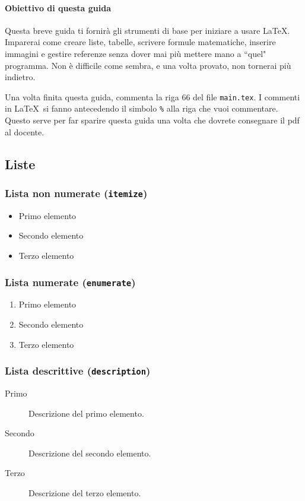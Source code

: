 \paragraph{Obiettivo di questa guida}
Questa breve guida ti fornirà gli strumenti di base per iniziare a usare \LaTeX. Imparerai come creare liste, tabelle, scrivere formule matematiche, inserire immagini e gestire referenze senza dover mai più mettere mano a ``quel" programma.
Non è difficile come sembra, e una volta provato, non tornerai più indietro.

\bigskip
\begin{tcolorbox}[
    colback=orange!10,
    colframe=orange!70!black,
    title=\textbf{Importante!},
    ]
    Una volta finita questa guida, commenta la riga 66 del file \texttt{main.tex}.
    I commenti in \LaTeX\ si fanno antecedendo il simbolo \texttt{\%} alla riga che vuoi commentare.
    Questo serve per far sparire questa guida una volta che dovrete consegnare il pdf al docente.
\end{tcolorbox}

\subsection*{Liste}

\subsubsection*{Lista non numerate (\texttt{itemize})}
\begin{itemize}
    \item Primo elemento
    \item Secondo elemento
    \item Terzo elemento
\end{itemize}

\subsubsection*{Lista numerate (\texttt{enumerate})}
\begin{enumerate}
    \item Primo elemento
    \item Secondo elemento
    \item Terzo elemento
\end{enumerate}

\subsubsection*{Lista descrittive (\texttt{description})}
\begin{description}
    \item[Primo] Descrizione del primo elemento.
    \item[Secondo] Descrizione del secondo elemento.
    \item[Terzo] Descrizione del terzo elemento.
\end{description}

